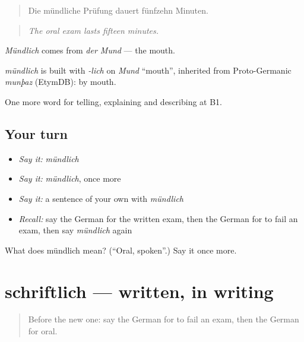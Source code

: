 \begin{quote}
Die mündliche Prüfung dauert fünfzehn Minuten.
\end{quote}

\begin{quote}
\emph{The oral exam lasts fifteen minutes.}
\end{quote}

\emph{Mündlich} comes from \emph{der Mund} — the mouth.

\begin{cousinweb}
\emph{mündlich} is built with \emph{-lich} on \emph{Mund} \textquotedblleft{}mouth\textquotedblright{}, inherited from Proto-Germanic \emph{munþaz} (EtymDB): by mouth.
\end{cousinweb}

\begin{grammarlens}[title={What you've built}]
One more word for telling, explaining and describing at B1.
\end{grammarlens}

\subsection*{Your turn}
\begin{itemize}
\raggedright
  \item \emph{Say it:} \emph{mündlich}
  \item \emph{Say it:} \emph{mündlich}, once more
  \item \emph{Say it:} a sentence of your own with \emph{mündlich}
  \item \emph{Recall:} say the German for the written exam, then the German for to fail an exam, then say \emph{mündlich} again
\end{itemize}

\begin{tcolorbox}[breakable,colback=teal!4,colframe=teal!35!black,title={Before you move on}]
What does mündlich mean? (\textquotedblleft{}Oral, spoken\textquotedblright{}.) Say it once more.
\end{tcolorbox}
\section[schriftlich]{schriftlich — written, in writing}

\label{lesson:GE-C375-schriftlich}



\begin{quote}
Before the new one: say the German for to fail an exam, then the German for oral.
\end{quote}


